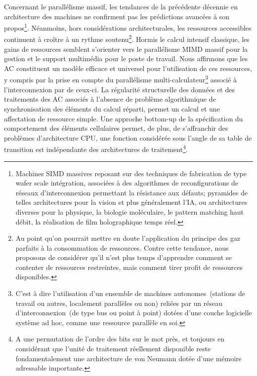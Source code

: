 Concernant le parall\'elisme massif, les tendances de la pr\'ec\'edente
d\'ecennie en architecture des machines ne confirment pas les
pr\'edictions avanc\'ees \`a son propos\footnote{%
  Machines SIMD massives reposant sur des techniques de fabrication de
  type wafer scale int\'egration, associ\'ees \`a des algorithmes de
  reconfigurations de r\'eseaux d'interconnexion permettant la
  r\'esistance aux d\'efauts; pyramides de telles architectures pour la
  vision et plus g\'en\'eralement l'IA, ou architectures diverses pour la
  physique, la biologie mol\'eculaire, le pattern matching haut d\'ebit,
  la r\'ealisation de film holographique temps r\'eel.}. %
N\'eanmoins, hors consid\'erations architecturales, les ressources
accessibles continuent \`a cro\^itre \`a un rythme soutenu\footnote{%
  Au point qu'on pourrait mettre en doute l'application du
  principe des gaz parfaits \`a la consommation de ressources. %
  Contre cette tendance, nous proposons de consid\'erer qu'il n'est plus
  temps d'apprendre comment se contenter de ressources restreintes,
  mais comment tirer profit de ressources disponibles.}. %
Hormis le calcul intensif classique, les gains de ressources semblent
s'orienter vers le parall\'elisme MIMD massif pour la gestion et le
support multim\'edia pour le poste de travail. %
Nous affirmons que les AC constituent un mod\`ele efficace et universel
pour l'utilisation de ces ressources, y compris par la prise en compte
du parall\'elisme multi-calculateur\footnote{%
  C'est \`a dire l'utilisation d'un ensemble de machines
  autonomes~(stations de travail ou autres, localement parall\`eles ou
  non) reli\'ees par un r\'eseau d'interconnexion~(de type bus ou point
  \`a point) dot\'ees d'une couche logicielle syst\`eme ad hoc, comme une
  ressource parall\`ele en soi.} %
associ\'e \`a l'interconnexion par  %
de ceux-ci. %
La r\'egularit\'e structurelle des donn\'ees et des traitements des AC
associ\'es \`a l'absence de probl\`eme algorithmique de synchronisation
des \'el\'ements du calcul r\'eparti, permet un calcul et une affectation de
ressource simple. %
Une approche bottom-up de la sp\'ecification du comportement des
\'el\'ements cellulaires permet, de plus, de s'affranchir des probl\`emes
d'architecture CPU, une fonction consid\'er\'ee sous l'angle de sa table
de transition est ind\'ependante des architectures de
traitement\footnote{%
  A une permutation de l'ordre des bits sur le mot pr\`es, et toujours en
  consid\'erant que l'unit\'e de traitement r\'eellement disponible reste
  fondamentalement une architecture de von Neumann dot\'ee d'une m\'emoire
  adressable importante.}. %


